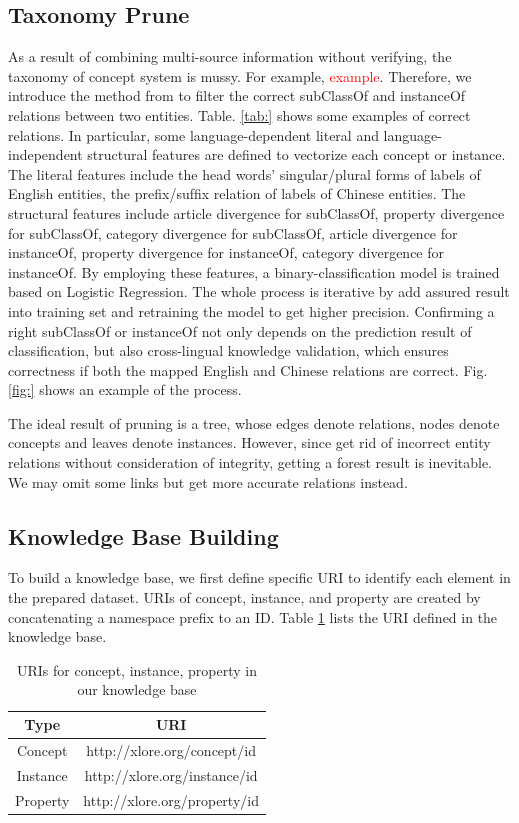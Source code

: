 \documentclass[runningheads,a4paper]{llncs}
\begin{document}
\subsection{Taxonomy Prune}
\label{sec:tp}
As a result of combining multi-source information without verifying, the taxonomy of concept system is mussy. For example, \textcolor{red}{example}. Therefore, we introduce the method from\cite{wang2014cross} to filter the correct subClassOf and instanceOf relations between two entities. Table. \ref{tab:} shows some examples of correct relations. In particular, some language-dependent literal and language-independent structural features are defined to vectorize each concept or instance. The literal features include the head words’ singular/plural forms of labels of English entities, the preﬁx/sufﬁx relation of labels of Chinese entities. The structural features include article divergence for subClassOf, property divergence for subClassOf, category divergence for subClassOf, article divergence for instanceOf, property divergence for instanceOf, category divergence for instanceOf. By employing these features, a binary-classification model is trained based on Logistic Regression. The whole process is iterative by add assured result into training set and retraining the model to get higher precision. Confirming a right subClassOf or instanceOf not only depends on the prediction result of classification, but also cross-lingual knowledge validation, which ensures correctness if both the mapped English and Chinese relations are correct. Fig. \ref{fig:} shows an example of the process.

The ideal result of pruning is a tree, whose edges denote relations, nodes denote concepts and leaves denote instances. However, since get rid of incorrect entity relations without consideration of integrity, getting a forest result is inevitable. We may omit some links but get more accurate relations instead.

\subsection{Knowledge Base Building}
To build a knowledge base, we first define specific URI to identify each element in the prepared dataset. URIs of concept, instance, and property are created by concatenating a namespace prefix to an ID. Table \ref{tab:uris} lists the URI defined in the knowledge base.
\begin{table}[h]
\small
\centering
\caption{URIs for concept, instance, property in our knowledge base}
\label{tab:uris}
    \begin{tabular}{|c|c|}
        \hline
        Type     & URI                          \\ \hline
        Concept  & http://xlore.org/concept/id  \\ \hline
        Instance & http://xlore.org/instance/id \\ \hline
        Property & http://xlore.org/property/id \\ \hline
    \end{tabular}
\end{table}
\end{document}
